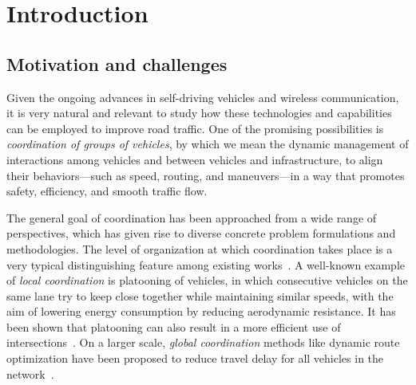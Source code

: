 \documentclass[a4paper]{report}
\theoremstyle{definition}
\theoremstyle{plain}
\begin{document}
\newpage
\tableofcontents









\chapter{Introduction}\label{chap:introduction}

\section{Motivation and challenges}

%
Given the ongoing advances in self-driving vehicles and wireless communication,
it is very natural and relevant to study how these technologies and capabilities
can be employed to improve road traffic.
%
One of the promising possibilities is \emph{coordination of groups of vehicles},
by which we mean the dynamic management of interactions among vehicles and
between vehicles and infrastructure, to align their behaviors---such as speed,
routing, and maneuvers---in a way that promotes safety, efficiency, and smooth
traffic flow.

%
The general goal of coordination has been approached from a wide range of
perspectives, which has given rise to diverse concrete problem formulations and
methodologies.
%
The level of organization at which coordination takes place is a very typical
distinguishing feature among existing
works~\cite{marianiCoordinationAutonomousVehicles2022}.
%
A well-known example of \emph{local coordination} is platooning of vehicles, in
which consecutive vehicles on the same lane try to keep close together while
maintaining similar speeds, with the aim of lowering energy consumption by
reducing aerodynamic resistance. It has been shown that platooning can also
result in a more efficient use of
intersections~\cite{miculescuPollingsystemsbasedAutonomousVehicle2016,tachetRevisitingStreetIntersections2016,timmermanPlatoonFormingAlgorithms2021}.
On a larger scale, \emph{global coordination} methods like dynamic route
optimization have been proposed to reduce travel delay for all vehicles in the
network~\cite{rossiRoutingAutonomousVehicles2018}.
\end{document}
